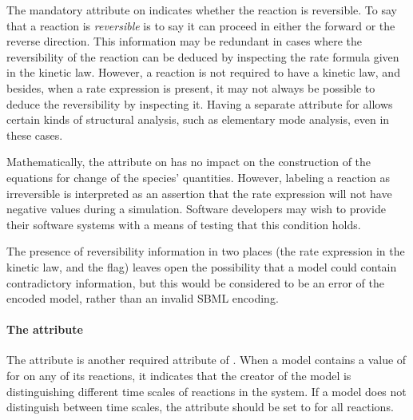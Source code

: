 The mandatory  attribute  on \Reaction
indicates whether the reaction is reversible.  To say that a
reaction is \emph{reversible} is to say it can proceed in either
the forward or the reverse direction.  This information may be
redundant in cases where the reversibility of the reaction can be
deduced by inspecting the rate formula given in the kinetic law.
However, a reaction is not required to have a kinetic law, and
besides, when a rate expression is present, it may not always be
possible to deduce the reversibility by inspecting it.  Having a
separate attribute for  allows certain kinds of
structural analysis, such as elementary mode analysis, even in
these cases.

Mathematically, the  attribute on \Reaction has
no impact on the construction of the equations for change of the
species' quantities.  However, labeling a reaction as irreversible
is interpreted as an assertion that the rate expression will not
have negative values during a simulation.  Software developers may
wish to provide their software systems with a means of testing
that this condition holds.

The presence of reversibility information in two places (\ie the
rate expression in the kinetic law, and the 
flag) leaves open the possibility that a model could contain
contradictory information, but this would be considered to be an
error of the encoded model, rather than an invalid SBML encoding.


\paragraph{The  attribute }
\label{sec:fast}

The  attribute  is another required 
attribute of \Reaction.  When a model contains a value of
 for  on any of its reactions, it indicates
that the creator of the model is distinguishing different time
scales of reactions in the system.  If a model does not
distinguish between time scales, the  attribute should
be set to  for all reactions.

